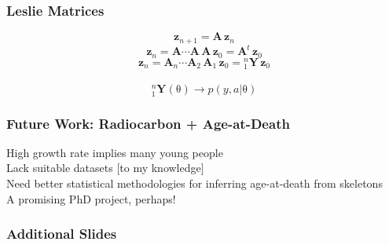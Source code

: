 \documentclass{beamer}
\newcommand{\greekbf}[1]{\boldsymbol{\mathrm{#1}}}
\begin{document}
\begin{frame}[t]
  \frametitle{Leslie Matrices}
\begin{minipage}{0\linewidth}
\begin{flushleft}                           
\begin{equation*}
      \mathbf{z}_{n+1} = \mathbf{A} \, \mathbf{z}_{n}
\end{equation*}
\pause
\begin{equation*}
	\mathbf{z}_{n} = \mathbf{A} \cdots \mathbf{A} \, \mathbf{A} \, \mathbf{z}_{0} = \mathbf{A}^t \, \mathbf{z}_{0}
\end{equation*}
\pause
\begin{equation*}
	\mathbf{z}_{n} = \mathbf{A}_n \cdots \mathbf{A}_2 \, \mathbf{A}_1 \, \mathbf{z}_{0} = {}^n_1\mathbf{Y} \, \mathbf{z}_{0}
\end{equation*}
\pause
\\
\begin{equation*}
	{}^n_1\mathbf{Y}(\greekbf{\theta}) \longrightarrow p(y,a|\greekbf{\theta})
\end{equation*}
\end{flushleft} 
\end{minipage}
\end{frame}

\begin{frame}[t]
  \frametitle{Future Work: Radiocarbon + Age-at-Death}
    \large High growth rate implies many young people \normalsize\\
    \pause
    \bigskip
    \large Lack suitable datasets [to my knowledge]\\
    \pause
    \bigskip
    \large Need better statistical methodologies for inferring age-at-death from skeletons\\
    \pause
    \bigskip
    \large A promising PhD project, perhaps!\\
\end{frame}

\begin{frame}[t]
  \frametitle{Additional Slides}
\end{frame}
\end{document}
